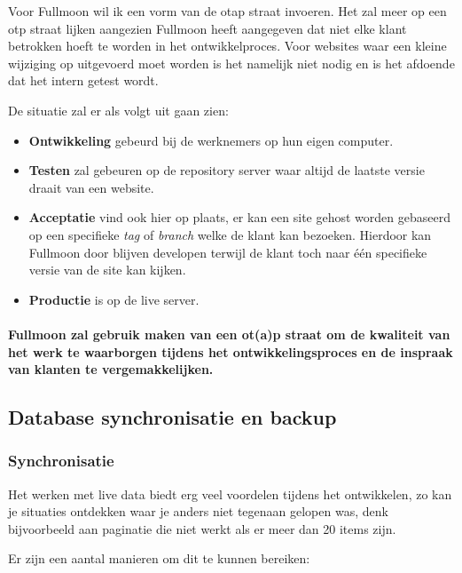 \documentclass[12pt,a4paper]{article}
\begin{document}
    Voor Fullmoon wil ik een vorm van de {\sc otap} straat invoeren. Het zal meer op een {\sc otp} straat lijken aangezien Fullmoon heeft aangegeven dat niet elke klant betrokken hoeft te worden in het ontwikkelproces. Voor websites waar een kleine wijziging op uitgevoerd moet worden is het namelijk niet nodig en is het afdoende dat het intern getest wordt.
    
    De situatie zal er als volgt uit gaan zien:
    
    \begin{itemize}
      \item \textbf{Ontwikkeling} gebeurd bij de werknemers op hun eigen computer.
      \item \textbf{Testen} zal gebeuren op de repository server waar altijd de laatste versie draait van een website.
      \item \textbf{Acceptatie} vind ook hier op plaats, er kan een site gehost worden gebaseerd op een specifieke \emph{tag} of \emph{branch} welke de klant kan bezoeken. Hierdoor kan Fullmoon door blijven developen terwijl de klant toch naar \'{e}\'{e}n specifieke versie van de site kan kijken.
      \item \textbf{Productie} is op de live server.
    \end{itemize}
    
    \paragraph{Fullmoon zal gebruik maken van een {\sc ot(a)p} straat om de kwaliteit van het werk te waarborgen tijdens het ontwikkelingsproces en de inspraak van klanten te vergemakkelijken.}
    
    \subsection{Database synchronisatie en backup}
    
    \subsubsection{Synchronisatie}
    
    Het werken met live data biedt erg veel voordelen tijdens het ontwikkelen, zo kan je situaties ontdekken waar je anders niet tegenaan gelopen was, denk bijvoorbeeld aan paginatie die niet werkt als er meer dan 20 items zijn. 
    
    Er zijn een aantal manieren om dit te kunnen bereiken:
    
\end{document}
